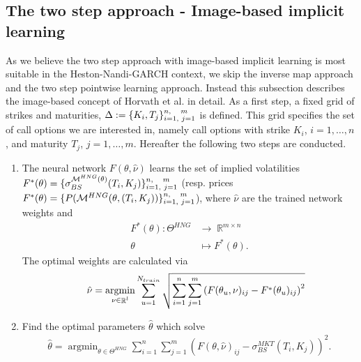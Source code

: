 \documentclass{article}
\DeclareMathOperator{\R}{\mathbb{R}}
\DeclareMathOperator*{\argmin}{argmin}
\begin{document}
\subsection{The two step approach - Image-based implicit learning}
As we believe the two step approach with image-based implicit learning is most suitable in the Heston-Nandi-GARCH context, we skip the inverse map approach and the two step pointwise learning approach. Instead this subsection describes the image-based concept of Horvath et al. \cite{Blanka} in detail. \newline
As a first step, a fixed grid of strikes and maturities, $\Delta := \{K_i, T_j\}_{i=1,\hspace{.1cm} j=1}^{n,\hspace{.35cm}m}$ is defined. This grid specifies the set of call options we are interested in, namely call options with strike $K_i$, $i=1,\ldots,n$, and maturity $T_j$, $j=1,\ldots,m$. Hereafter the following two steps are conducted.
\begin{enumerate}
    \item The neural network $F(\theta, \hat{\nu})$ learns the set of implied volatilities  $F^*(\theta) = \{\sigma_{BS}^{\mathcal{M}^{HNG}(\theta)}(T_i,K_j)\}_{i=1,\hspace{.1cm} j=1}^{n,\hspace{.35cm}m}$ (resp. prices $F^*(\theta) = \{P(\mathcal{M}^{HNG}(\theta, (T_i, K_j))\}_{i=1,\hspace{.1cm} j=1}^{n,\hspace{.35cm}m}$), where $\hat{\nu}$ are the trained network weights and 
    \begin{align*}
        F^*(\theta): \Theta^{HNG} &\to \R^{m \times n} \\
        \theta &\mapsto F^*(\theta).
    \end{align*}
    The optimal weights are calculated via 
    \begin{align*}
       \hspace{0.5cm} \hat{\nu} = \argmin_{\nu \in \R^l} \sum_{u=1}^{N_{train}}\sqrt{\sum_{i=1}^n\sum_{j=1}^{m}\left(F(\theta_u, \nu)_{ij} - F^*(\theta_u)_{ij}\right)^2}
    \end{align*}
    \item Find the optimal parameters $\hat{\theta}$ which solve
    \begin{align*}
        \hat{\theta} = \argmin_{\theta \in \Theta^{HNG}} \sum_{i=1}^{n}\sum_{j=1}^{m}(F(\theta, \hat{\nu})_{ij}-\sigma_{BS}^{MKT}(T_i,K_j))^2.
    \end{align*}
\end{enumerate}
\end{document}
